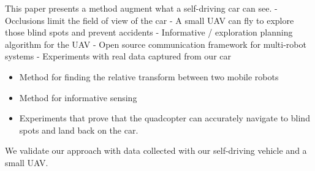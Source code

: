 This paper presents a method augment what a self-driving car can see.
- Occlusions limit the field of view of the car
- A small UAV can fly to explore those blind spots and prevent accidents
- Informative / exploration planning algorithm for the UAV
- Open source communication framework for multi-robot systems
- Experiments with real data captured from our car 

\begin{itemize}
\item
Method for finding the relative transform between two mobile robots
\item
Method for informative sensing
\item
Experiments that prove that the quadcopter can accurately navigate
to blind spots and land back on the car.
\end{itemize}

We validate our approach with data collected with our self-driving vehicle and a small UAV.